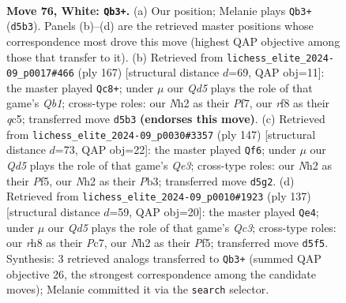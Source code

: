 \documentclass[11pt]{article}
\begin{document}
\clearpage

\begin{figure}[p]\centering
\begin{subfigure}{0.46\textwidth}\centering
\resizebox{\linewidth}{!}{%
\newchessgame
\chessboard[
  setfen={1k3r1r/p1q3p1/7p/3Q3P/3P2P1/4P3/7N/4b2K w - - 1 76},
  showmover=false,
  pgfstyle=straightmove, color=movearrow, markmove={d5-b3}
]}
\caption{}
\end{subfigure}\hfill
\begin{subfigure}{0.46\textwidth}\centering
\resizebox{\linewidth}{!}{%
\newchessgame
\chessboard[
  setfen={1q4k1/5pp1/2K4p/2Q5/p7/P5P1/1P3R1P/1b6 b - - 38 84},
  showmover=false,
  pgfstyle=straightmove, color=movearrow, markmove={b8-c8}
]}
\caption{}
\end{subfigure}
\\[4pt]
\begin{subfigure}{0.46\textwidth}\centering
\resizebox{\linewidth}{!}{%
\newchessgame
\chessboard[
  setfen={8/6k1/4q1p1/5p1p/7P/1p3RP1/1P3R1K/8 b - - 1 74},
  showmover=false,
  pgfstyle=straightmove, color=movearrow, markmove={e6-f6}
]}
\caption{}
\end{subfigure}\hfill
\begin{subfigure}{0.46\textwidth}\centering
\resizebox{\linewidth}{!}{%
\newchessgame
\chessboard[
  setfen={8/1kp5/2q3p1/5p1p/p6P/3Q2P1/1r3P2/5RK1 b - - 3 69},
  showmover=false,
  pgfstyle=straightmove, color=movearrow, markmove={c6-e4}
]}
\caption{}
\end{subfigure}
\caption{\textbf{Move 76, White: \texttt{Qb3+}.} (a) Our position; Melanie plays \texttt{Qb3+} (\texttt{d5b3}). Panels (b)--(d) are the retrieved master positions whose correspondence most drove this move (highest QAP objective among those that transfer to it). (b) Retrieved from \texttt{lichess\_elite\_2024-09\_p0017\#466} (ply 167) [structural distance $d$=69, QAP obj=11]: the master played \texttt{Qc8+}; under $\mu$ our \emph{Qd5} plays the role of that game's \emph{Qb1}; cross-type roles: our \emph{N}h2 as their \emph{P}f7, our \emph{r}f8 as their \emph{q}c5; transferred move \texttt{d5b3} \textbf{(endorses this move)}. (c) Retrieved from \texttt{lichess\_elite\_2024-09\_p0030\#3357} (ply 147) [structural distance $d$=73, QAP obj=22]: the master played \texttt{Qf6}; under $\mu$ our \emph{Qd5} plays the role of that game's \emph{Qe3}; cross-type roles: our \emph{N}h2 as their \emph{P}f5, our \emph{N}h2 as their \emph{P}b3; transferred move \texttt{d5g2}. (d) Retrieved from \texttt{lichess\_elite\_2024-09\_p0010\#1923} (ply 137) [structural distance $d$=59, QAP obj=20]: the master played \texttt{Qe4}; under $\mu$ our \emph{Qd5} plays the role of that game's \emph{Qc3}; cross-type roles: our \emph{r}h8 as their \emph{P}c7, our \emph{N}h2 as their \emph{P}f5; transferred move \texttt{d5f5}. Synthesis: 3 retrieved analogs transferred to \texttt{Qb3+} (summed QAP objective 26, the strongest correspondence among the candidate moves); Melanie committed it via the \texttt{search} selector.}
\label{fig:thought-m150}
\end{figure}
\end{document}

